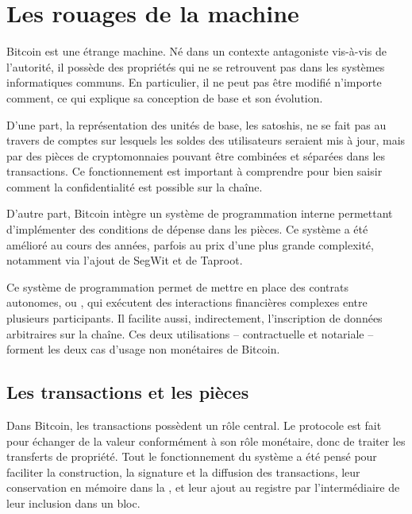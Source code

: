 
\chapter{Les rouages de la machine}
\label{ch:rouages}

Bitcoin est une étrange machine. Né dans un contexte antagoniste vis-à-vis de l'autorité, il possède des propriétés qui ne se retrouvent pas dans les systèmes informatiques communs. En particulier, il ne peut pas être modifié n'importe comment, ce qui explique sa conception de base et son évolution.

D'une part, la représentation des unités de base, les satoshis, ne se fait pas au travers de comptes sur lesquels les soldes des utilisateurs seraient mis à jour, mais par des pièces de cryptomonnaies pouvant être combinées et séparées dans les transactions. Ce fonctionnement est important à comprendre pour bien saisir comment la confidentialité est possible sur la chaîne.

D'autre part, Bitcoin intègre un système de programmation interne permettant d'implémenter des conditions de dépense dans les pièces. Ce système a été amélioré au cours des années, parfois au prix d'une plus grande complexité, notamment via l'ajout de SegWit et de Taproot.

Ce système de programmation permet de mettre en place des contrats autonomes, ou , qui exécutent des interactions financières complexes entre plusieurs participants. Il facilite aussi, indirectement, l'inscription de données arbitraires sur la chaîne. Ces deux utilisations -- contractuelle et notariale -- forment les deux cas d'usage non monétaires de Bitcoin.

\section*{Les transactions et les pièces} %

Dans Bitcoin, les transactions possèdent un rôle central. Le protocole est fait pour échanger de la valeur conformément à son rôle monétaire, donc de traiter les transferts de propriété. Tout le fonctionnement du système a été pensé pour faciliter la construction, la signature et la diffusion des transactions, leur conservation en mémoire dans la , et leur ajout au registre par l'intermédiaire de leur inclusion dans un bloc.

